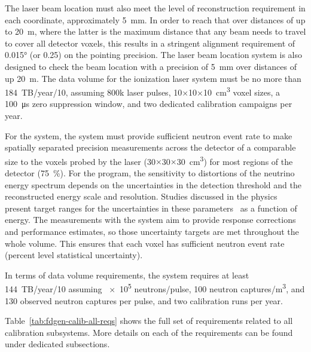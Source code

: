 The laser beam location must also meet the level of reconstruction requirement in each coordinate, approximately \SI{5}{\milli\m}. In order to reach that over distances of up to \SI{20}{\m}, where the latter is the maximum distance that any beam needs to travel to cover all detector voxels, this results in a stringent alignment requirement of \ang{0.015} (or \SI{0.25}{\mrad}) on the pointing precision. The laser beam location system is also designed to check the beam location with a precision of \SI{5}{\milli\m} over distances of up \SI{20}{\m}. 
The data volume for the ionization laser system must be %
no more than \num{184}~TB/year/\SI{10}{\kt}, assuming \num{800}k laser pulses, \num{10}$\times$\num{10}$\times$\SI{10}{\cubic\cm} voxel sizes, a \SI{100}{\micro\s} zero suppression window, and two dedicated calibration campaigns per year.

For the  system, the system must provide sufficient neutron event rate to make spatially separated precision measurements across the detector of a comparable size to the voxels probed by the laser (\num{30}$\times$\num{30}$\times$\SI{30}{\cubic\cm}) for most regions of the detector (\SI{75}{\%}). 
For the  program, the sensitivity to distortions of the neutrino energy spectrum depends on the uncertainties in the detection threshold and the reconstructed energy scale and resolution. Studies discussed in the physics  present target ranges for the uncertainties in these parameters~\cite{bib:docdb14068} as a function of energy. The measurements with the  system aim to provide response corrections and performance estimates, so those uncertainty targets are met throughout the whole volume. This ensures that each voxel has sufficient neutron event rate (percent level statistical uncertainty).




In terms of data volume requirements, the  system requires at least \num{144}~TB/year/\SI{10}{\kt} assuming \num{e5} neutrons/pulse, \num{100} neutron captures/\si{\cubic\m},
and \num{130} observed neutron captures per pulse, and two calibration runs per year. 

Table~\ref{tab:fdgen-calib-all-reqs} shows the full set of requirements related to all calibration subsystems. More details on each of the requirements can be found under dedicated subsections.   

%





